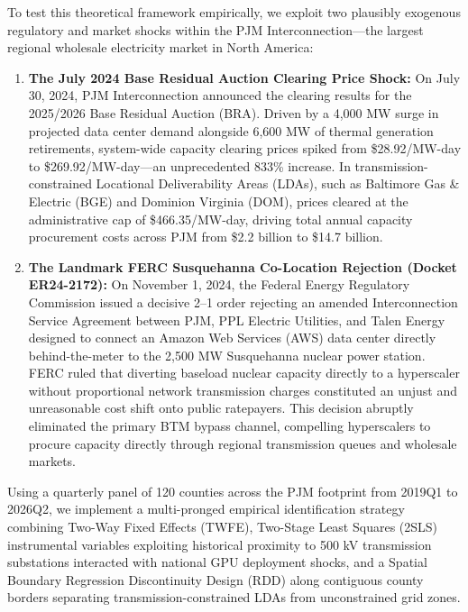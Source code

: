 \documentclass[11pt,a4paper]{article}
\begin{document}
To test this theoretical framework empirically, we exploit two plausibly exogenous regulatory and market shocks within the PJM Interconnection---the largest regional wholesale electricity market in North America:
\begin{enumerate}
    \item \textbf{The July 2024 Base Residual Auction Clearing Price Shock:} On July 30, 2024, PJM Interconnection announced the clearing results for the 2025/2026 Base Residual Auction (BRA). Driven by a 4,000 MW surge in projected data center demand alongside 6,600 MW of thermal generation retirements, system-wide capacity clearing prices spiked from \$28.92/MW-day to \$269.92/MW-day---an unprecedented 833\% increase. In transmission-constrained Locational Deliverability Areas (LDAs), such as Baltimore Gas \& Electric (BGE) and Dominion Virginia (DOM), prices cleared at the administrative cap of \$466.35/MW-day, driving total annual capacity procurement costs across PJM from \$2.2 billion to \$14.7 billion.
    \item \textbf{The Landmark FERC Susquehanna Co-Location Rejection (Docket ER24-2172):} On November 1, 2024, the Federal Energy Regulatory Commission issued a decisive 2--1 order rejecting an amended Interconnection Service Agreement between PJM, PPL Electric Utilities, and Talen Energy designed to connect an Amazon Web Services (AWS) data center directly behind-the-meter to the 2,500 MW Susquehanna nuclear power station. FERC ruled that diverting baseload nuclear capacity directly to a hyperscaler without proportional network transmission charges constituted an unjust and unreasonable cost shift onto public ratepayers. This decision abruptly eliminated the primary BTM bypass channel, compelling hyperscalers to procure capacity directly through regional transmission queues and wholesale markets.
\end{enumerate}

Using a quarterly panel of 120 counties across the PJM footprint from 2019Q1 to 2026Q2, we implement a multi-pronged empirical identification strategy combining Two-Way Fixed Effects (TWFE), Two-Stage Least Squares (2SLS) instrumental variables exploiting historical proximity to 500 kV transmission substations interacted with national GPU deployment shocks, and a Spatial Boundary Regression Discontinuity Design (RDD) along contiguous county borders separating transmission-constrained LDAs from unconstrained grid zones.
\end{document}
